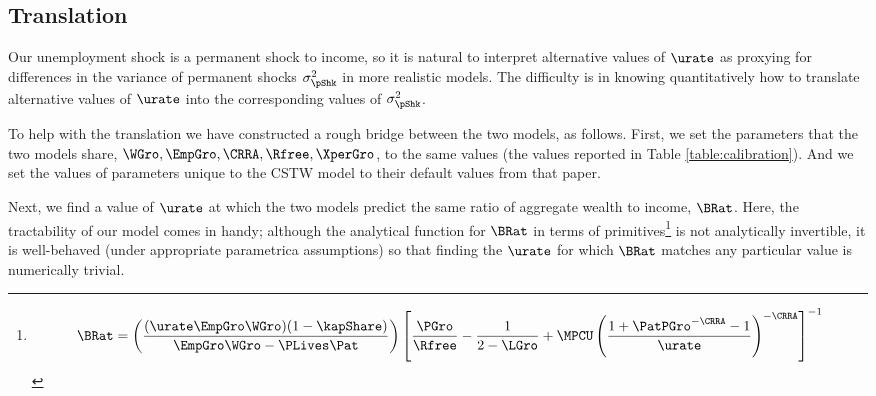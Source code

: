 \documentclass[../../cjSOE.tex]{subfiles}
\begin{document}
  


\subsection{Translation}


Our unemployment shock is a permanent shock to income, so it is natural to interpret alternative values of $\urate$ as proxying for differences in the variance of permanent shocks $\sigma^{2}_{\pShk}$ in more realistic models. The difficulty is in knowing quantitatively how to translate alternative values of $\urate$ into the corresponding values of $\sigma^{2}_{\pShk}$.

To help with the translation we have constructed a rough bridge between the two models, as follows.  First, we set the parameters that the two models share, $\WGro, \EmpGro, \CRRA, \Rfree, \XperGro$, to the same values (the values reported in Table \ref{table:calibration}).  And we set the values of parameters unique to the CSTW model to their default values from that paper. 

Next, we find a value of $\urate$ at which the two models predict the same ratio of aggregate wealth to income, $\BRat$.  Here, the tractability of our model comes in handy; although the analytical function for $\BRat$ in terms of primitives\footnote{
  \begin{equation}
    \BRat = \left(      \frac{(\urate \EmpGro \WGro) (1-\kapShare)}{\EmpGro \WGro - \PLives \Pat}\right)\left[\frac{\PGro}{\Rfree}-\frac{1}{2-\LGro}+\MPCU\left(\frac{1+\PatPGro^{-\CRRA}-1}{\urate}\right)^{-\CRRA}\right]^{-1}
  \end{equation}}
is not analytically invertible, it is well-behaved (under appropriate parametrica assumptions) so that finding the $\urate$ for which $\BRat$ matches any particular value is numerically trivial.
\end{document}

